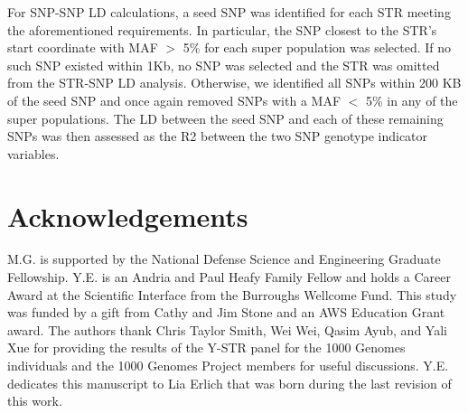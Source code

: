 For SNP-SNP LD calculations, a seed SNP was identified for each STR meeting the aforementioned requirements. In particular, the SNP closest to the STR’s start coordinate with MAF $>$ 5\% for each super population was selected. If no such SNP existed within 1Kb, no SNP was selected and the STR was omitted from the STR-SNP LD analysis. Otherwise, we identified all SNPs within 200 KB of the seed SNP and once again removed SNPs with a MAF $<$ 5\% in any of the super populations. The LD between the seed SNP and each of these remaining SNPs was then assessed as the R2 between the two SNP genotype indicator variables.  

\section{Acknowledgements}
M.G. is supported by the National Defense Science and Engineering Graduate Fellowship. Y.E. is an Andria and Paul Heafy Family Fellow and holds a Career Award at the Scientific Interface from the Burroughs Wellcome Fund. This study was funded by a gift from Cathy and Jim Stone and an AWS Education Grant award. The authors thank Chris Taylor Smith, Wei Wei, Qasim Ayub, and Yali Xue for providing the results of the Y-STR panel for the 1000 Genomes individuals and the 1000 Genomes Project members for useful discussions. Y.E. dedicates this manuscript to Lia Erlich that was born during the last revision of this work.